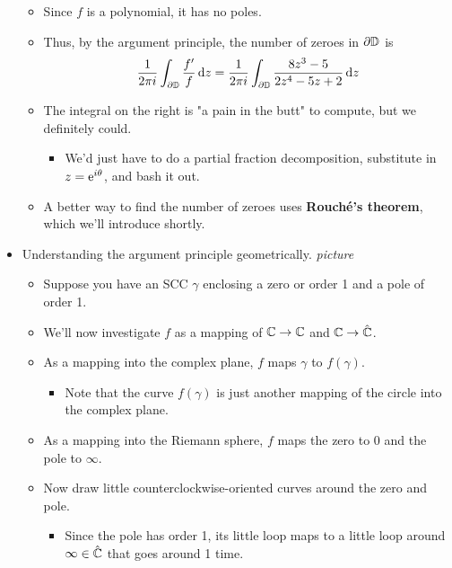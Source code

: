 \documentclass[../notes.tex]{subfiles}
\begin{document}
\begin{itemize}
    \begin{itemize}
        \item Since $f$ is a polynomial, it has no poles.
        \item Thus, by the argument principle, the number of zeroes in $\partial\D$ is
        \begin{equation*}
            \frac{1}{2\pi i}\int_{\partial\D}\frac{f'}{f}\dd{z} = \frac{1}{2\pi i}\int_{\partial\D}\frac{8z^3-5}{2z^4-5z+2}\dd{z}
        \end{equation*}
        \item The integral on the right is "a pain in the butt" to compute, but we definitely could.
        \begin{itemize}
            \item We'd just have to do a partial fraction decomposition, substitute in $z=\e[i\theta]$, and bash it out.
        \end{itemize}
        \item A better way to find the number of zeroes uses \textbf{Rouch\'{e}'s theorem}, which we'll introduce shortly.
    \end{itemize}
    \item Understanding the argument principle geometrically.
    \emph{picture}
    \begin{itemize}
        \item Suppose you have an SCC $\gamma$ enclosing a zero or order 1 and a pole of order 1.
        \item We'll now investigate $f$ as a mapping of $\C\to\C$ and $\C\to\hat{\C}$.
        \item As a mapping into the complex plane, $f$ maps $\gamma$ to $f(\gamma)$.
        \begin{itemize}
            \item Note that the curve $f(\gamma)$ is just another mapping of the circle into the complex plane.
        \end{itemize}
        \item As a mapping into the Riemann sphere, $f$ maps the zero to 0 and the pole to $\infty$.
        \item Now draw little counterclockwise-oriented curves around the zero and pole.
        \begin{itemize}
            \item Since the pole has order 1, its little loop maps to a little loop around $\infty\in\hat{\C}$ that goes around 1 time.
            \begin{itemize}

\end{itemize}
\end{itemize}
\end{itemize}
\end{itemize}
\end{document}

